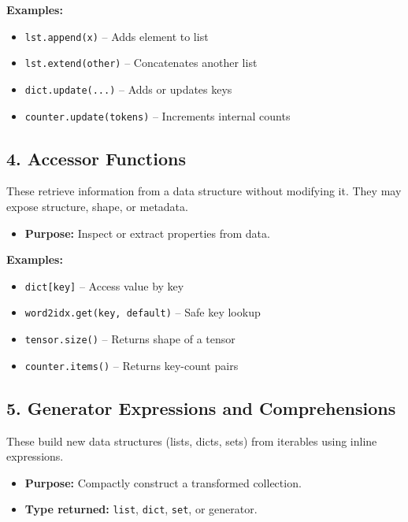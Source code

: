 \textbf{Examples:}

\begin{itemize}
	\item \texttt{lst.append(x)} – Adds element to list
	\item \texttt{lst.extend(other)} – Concatenates another list
	\item \texttt{dict.update(...)} – Adds or updates keys
	\item \texttt{counter.update(tokens)} – Increments internal counts
\end{itemize}

\subsection*{4. Accessor Functions}

These retrieve information from a data structure without modifying it. They may expose structure, shape, or metadata.

\begin{itemize}
	\item \textbf{Purpose:} Inspect or extract properties from data.
\end{itemize}

\textbf{Examples:}

\begin{itemize}
	\item \texttt{dict[key]} – Access value by key
	\item \texttt{word2idx.get(key, default)} – Safe key lookup
	\item \texttt{tensor.size()} – Returns shape of a tensor
	\item \texttt{counter.items()} – Returns key-count pairs
\end{itemize}

\subsection*{5. Generator Expressions and Comprehensions}

These build new data structures (lists, dicts, sets) from iterables using inline expressions.

\begin{itemize}
	\item \textbf{Purpose:} Compactly construct a transformed collection.
	\item \textbf{Type returned:} \texttt{list}, \texttt{dict}, \texttt{set}, or generator.
\end{itemize}


